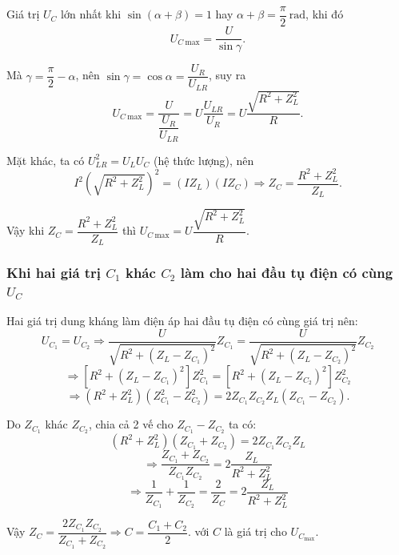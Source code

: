 Giá trị $U_C$ lớn nhất khi $\sin(\alpha+\beta)=1$ hay $\alpha+\beta = \dfrac{\pi}{2}\ \text {rad}$, khi đó
\begin{equation*}
	U_{C\ \text{max}}=\dfrac{U}{\sin \gamma}.
\end{equation*}

Mà $\gamma = \dfrac{\pi}{2} - \alpha$, nên $\sin \gamma = \cos \alpha = \dfrac{U_R}{U_{LR}}$,
suy ra
\begin{equation*}
	U_{C\ \text{max}}=\dfrac{U}{\dfrac{U_R}{U_{LR}}}=U\dfrac{U_{LR}}{U_R}=U\dfrac{\sqrt{R^2 + Z_L^2}}{R}.
\end{equation*}

Mặt khác, ta có $U_{LR}^2 = U_L U_C$ (hệ thức lượng), nên
\begin{equation*}
	I^2 \left(\sqrt {R^2 + Z_L^2}\right)^2 = (I Z_L) (I Z_C)\Rightarrow Z_C=\dfrac{R^2 + Z_L^2}{Z_L}.
\end{equation*}

Vậy khi $Z_C=\dfrac{R^2 + Z_L^2}{Z_L}$ thì $U_{C\ \text{max}}=U\dfrac{\sqrt{R^2 + Z_L^2}}{R}$.
\subsubsection{Khi hai giá trị $C_1$ khác $C_2$ làm cho hai đầu tụ điện có cùng $U_C$}

Hai giá trị dung kháng làm điện áp hai đầu tụ điện có cùng giá trị nên:
$$U_{C_1}=U_{C_2} \Rightarrow \dfrac{U}{\sqrt{R^2+(Z_{L}-Z_{C_1})^2}}Z_{C_1}=\dfrac{U}{\sqrt{R^2+(Z_{L}-Z_{C_2})^2}}Z_{C_2}$$
$$\Rightarrow [R^2+(Z_{L}-Z_{C_1})^2]Z^2_{C_1} = [R^2+(Z_{L}-Z_{C_2})^2]Z^2_{C_2}$$
$$\Rightarrow (R^2+Z_L^2)(Z^2_{C_1} - Z^2_{C_2})=2Z_{C_1}Z_{C_2} Z_L (Z_{C_1}- Z_{C_2}).$$

Do $Z_{C_1}$ khác $Z_{C_2}$, chia cả 2 vế cho $Z_{C_1}-Z_{C_2}$ ta có:
$$(R^2+Z_L^2)(Z_{C_1}+Z_{C_2})=2Z_{C_1}Z_{C_2} Z_L$$
$$\Rightarrow \dfrac{Z_{C_1}+Z_{C_2}}{Z_{C_1}Z_{C_2}} = 2 \dfrac{Z_L}{R^2+Z_L^2}$$
$$\Rightarrow \dfrac{1}{Z_{C_1}} + \dfrac{1}{Z_{C_2}}  = \dfrac{2}{Z_{C}} =2 \dfrac{Z_L}{R^2+Z_L^2}$$

Vậy $Z_C = \dfrac{2Z_{C_1}Z_{C_2}}{Z_{C_1}+Z_{C_2}} \Rightarrow C = \dfrac{C_1+C_2}{2}.$ với $C$ là giá trị cho $U_{C_\text{max}}$.

